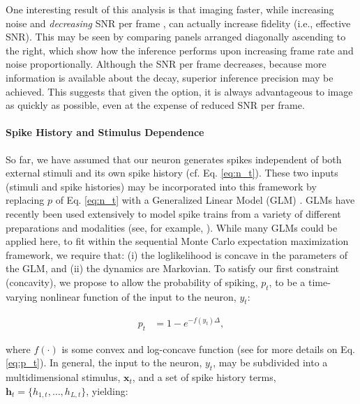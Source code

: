 \documentclass[10pt]{article}
\providecommand{\ve}[1]{\boldsymbol{#1}}
\providecommand{\ve}[1]{\boldsymbol{#1}}
\begin{document}
One interesting result of this analysis is that imaging faster, while increasing noise and \emph{decreasing} SNR per frame \cite{SjulsonMiesenbock07}, can actually increase fidelity (i.e., effective SNR).  This may be seen by comparing panels arranged diagonally ascending to the right, which show how the inference performs upon increasing frame rate and noise proportionally.  Although the SNR per frame decreases, because more information is available about the decay, superior inference precision may be achieved. This suggests that given the option, it is always advantageous to image as quickly as possible, even at the expense of reduced SNR per frame.

\paragraph{Spike History and Stimulus Dependence}

So far, we have assumed that our neuron generates spikes independent of both external stimuli and its own spike history (cf. Eq. \ref{eq:n_t}). These two inputs (stimuli and spike histories) may be incorporated into this framework by replacing $p$ of Eq. \ref{eq:n_t} with a Generalized Linear Model (GLM) \cite{McCullaghNelder89}.  GLMs have recently been used extensively to model spike trains from a variety of different preparations and modalities (see, for example,  \cite{PaninskiLewi07}). While many GLMs could be applied here, to fit within the sequential Monte Carlo expectation maximization framework, we require that: (i) the loglikelihood is concave in the parameters of the GLM, and (ii) the dynamics are Markovian.  To satisfy our first constraint (concavity), we propose to allow the probability of spiking, $p_t$, to be a time-varying nonlinear function of the input to the neuron, $y_t$:

\begin{align} \label{eq:p_t}
p_t &= 1 - e^{-f(y_t) \Delta},
\end{align}


\noindent where $f(\cdot)$ is some convex and log-concave function (see \cite{EscolaPaninski07} for more details on Eq. \ref{eq:p_t}).  In general, the input to the neuron, $y_t$, may be subdivided into a multidimensional stimulus, $\ve{x}_t$, and a set of spike history terms, $\ve{h}_t=\{h_{1,t}, \ldots, h_{L,t}\}$, yielding:
\end{document}
